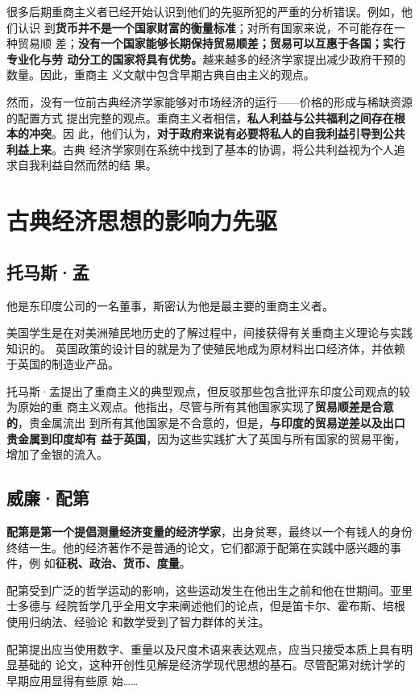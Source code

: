 很多后期重商主义者已经开始认识到他们的先驱所犯的严重的分析错误。例如，他们认识
到\textbf{货币并不是一个国家财富的衡量标准}；对所有国家来说，不可能存在一种贸易顺
差；\textbf{没有一个国家能够长期保持贸易顺差；贸易可以互惠于各国；实行专业化与劳
  动分工的国家将具有优势。}越来越多的经济学家提出减少政府干预的数量。因此，重商主
义文献中包含早期古典自由主义的观点。

然而，没有一位前古典经济学家能够对市场经济的运行——价格的形成与稀缺资源的配置方式
提出完整的观点。重商主义者相信，\textbf{私人利益与公共福利之间存在根本的冲突}。因
此，他们认为，\textbf{对于政府来说有必要将私人的自我利益引导到公共利益上来}。古典
经济学家则在系统中找到了基本的协调，将公共利益视为个人追求自我利益自然而然的结
果。

\section{古典经济思想的影响力先驱}

\subsection{托马斯·孟}

他是东印度公司的一名董事，斯密认为他是最主要的重商主义者。

美国学生是在对美洲殖民地历史的了解过程中，间接获得有关重商主义理论与实践知识的。
英国政策的设计目的就是为了使殖民地成为原材料出口经济体，并依赖于英国的制造业产品。

托马斯·孟提出了重商主义的典型观点，但反驳那些包含批评东印度公司观点的较为原始的重
商主义观点。他指出，尽管与所有其他国家实现了\textbf{贸易顺差是合意的}，贵金属流出
到所有其他国家是不合意的，但是，\textbf{与印度的贸易逆差以及出口贵金属到印度却有
  益于英国}，因为这些实践扩大了英国与所有国家的贸易平衡，增加了金银的流入。

\subsection{威廉·配第}

\textbf{配第是第一个提倡测量经济变量的经济学家}，出身贫寒，最终以一个有钱人的身份
终结一生。他的经济著作不是普通的论文，它们都源于配第在实践中感兴趣的事件，例
如\textbf{征税、政治、货币、度量}。

配第受到广泛的哲学运动的影响，这些运动发生在他出生之前和他在世期间。亚里士多德与
经院哲学几乎全用文字来阐述他们的论点，但是笛卡尔、霍布斯、培根使用归纳法、经验论
和数学受到了智力群体的关注。

配第提出应当使用数字、重量以及尺度术语来表达观点，应当只接受本质上具有明显基础的
论文，这种开创性见解是经济学现代思想的基石。尽管配第对统计学的早期应用显得有些原
始……

